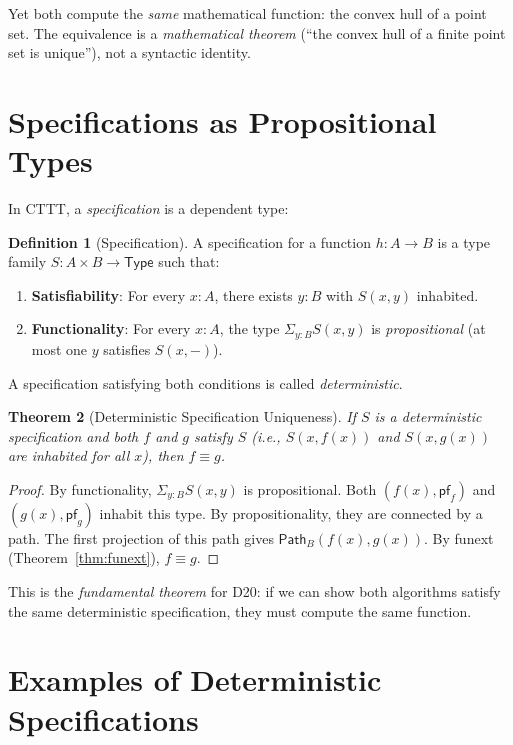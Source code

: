 \documentclass[11pt,a4paper]{report}
\theoremstyle{definition}
\newtheorem{definition}{Definition}[chapter]
\theoremstyle{plain}
\newtheorem{theorem}[definition]{Theorem}
\newcommand{\Path}{\mathsf{Path}}
\newcommand{\Type}{\mathsf{Type}}
\begin{document}
Yet both compute the \emph{same} mathematical function: the convex
hull of a point set.  The equivalence is a \emph{mathematical theorem}
(``the convex hull of a finite point set is unique''), not a
syntactic identity.

\section{Specifications as Propositional Types}

In CTTT, a \emph{specification} is a dependent type:

\begin{definition}[Specification]
A specification for a function $h : A \to B$ is a type family
$S : A \times B \to \Type$ such that:
\begin{enumerate}
  \item \textbf{Satisfiability}: For every $x : A$, there exists
    $y : B$ with $S(x, y)$ inhabited.
  \item \textbf{Functionality}: For every $x : A$, the type
    $\Sigma_{y:B} S(x, y)$ is \emph{propositional} (at most one
    $y$ satisfies $S(x, -)$).
\end{enumerate}
A specification satisfying both conditions is called
\emph{deterministic}.
\end{definition}

\begin{theorem}[Deterministic Specification Uniqueness]
\label{thm:det-spec}
If $S$ is a deterministic specification and both $f$ and $g$ satisfy
$S$ (i.e., $S(x, f(x))$ and $S(x, g(x))$ are inhabited for all $x$),
then $f \equiv g$.
\end{theorem}

\begin{proof}
By functionality, $\Sigma_{y:B} S(x, y)$ is propositional.  Both
$(f(x), \mathsf{pf}_f)$ and $(g(x), \mathsf{pf}_g)$ inhabit this
type.  By propositionality, they are connected by a path.  The first
projection of this path gives $\Path_B(f(x), g(x))$.  By funext
(Theorem~\ref{thm:funext}), $f \equiv g$.
\end{proof}

This is the \emph{fundamental theorem} for D20: if we can show
both algorithms satisfy the same deterministic specification,
they must compute the same function.

\section{Examples of Deterministic Specifications}
\end{document}
